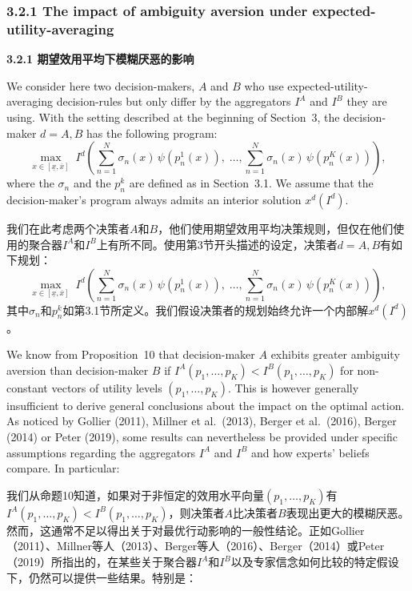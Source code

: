 \documentclass[12pt,a4paper]{article}
\newenvironment{original}
  {\par\noindent\ignorespaces}
  {\par}
\newenvironment{translation}
  {\par\noindent{\color{transblue}\ignorespaces}}
  {\par\medskip}
\begin{document}
\subsubsection{3.2.1 The impact of ambiguity aversion under expected-utility-averaging}
{\color{transblue}\textbf{3.2.1 期望效用平均下模糊厌恶的影响}}

\begin{original}
We consider here two decision-makers, $A$ and $B$ who use expected-utility-averaging decision-rules but only differ by the aggregators $I^{A}$ and $I^{B}$ they are using. With the setting described at the beginning of Section~3, the decision-maker $d = A, B$ has the following program:
\[
\max_{x \in [\underline{x}, \overline{x}]} \; I^{d}\!\left( \sum_{n=1}^{N} \sigma_{n}(x) \, \psi(p^{1}_{n}(x)), \;\dots, \sum_{n=1}^{N} \sigma_{n}(x) \, \psi(p^{K}_{n}(x)) \right), \tag{10}
\]
where the $\sigma_{n}$ and the $p^{k}_{n}$ are defined as in Section~3.1. We assume that the decision-maker's program always admits an interior solution $x^{d}(I^{d})$.
\end{original}

\begin{translation}
我们在此考虑两个决策者$A$和$B$，他们使用期望效用平均决策规则，但仅在他们使用的聚合器$I^{A}$和$I^{B}$上有所不同。使用第3节开头描述的设定，决策者$d = A, B$有如下规划：
\[
\max_{x \in [\underline{x}, \overline{x}]} \; I^{d}\!\left( \sum_{n=1}^{N} \sigma_{n}(x) \, \psi(p^{1}_{n}(x)), \;\dots, \sum_{n=1}^{N} \sigma_{n}(x) \, \psi(p^{K}_{n}(x)) \right), \tag{10}
\]
其中$\sigma_{n}$和$p^{k}_{n}$如第3.1节所定义。我们假设决策者的规划始终允许一个内部解$x^{d}(I^{d})$。
\end{translation}

\begin{original}
We know from Proposition~10 that decision-maker $A$ exhibits greater ambiguity aversion than decision-maker $B$ if $I^{A}(p_{1}, \dots, p_{K}) < I^{B}(p_{1}, \dots, p_{K})$ for non-constant vectors of utility levels $(p_{1}, \dots, p_{K})$. This is however generally insufficient to derive general conclusions about the impact on the optimal action. As noticed by Gollier (2011), Millner et al.\ (2013), Berger et al.\ (2016), Berger (2014) or Peter (2019), some results can nevertheless be provided under specific assumptions regarding the aggregators $I^{A}$ and $I^{B}$ and how experts' beliefs compare. In particular:
\end{original}

\begin{translation}
我们从命题10知道，如果对于非恒定的效用水平向量$(p_{1}, \dots, p_{K})$有$I^{A}(p_{1}, \dots, p_{K}) < I^{B}(p_{1}, \dots, p_{K})$，则决策者$A$比决策者$B$表现出更大的模糊厌恶。然而，这通常不足以得出关于对最优行动影响的一般性结论。正如Gollier（2011）、Millner等人（2013）、Berger等人（2016）、Berger（2014）或Peter（2019）所指出的，在某些关于聚合器$I^{A}$和$I^{B}$以及专家信念如何比较的特定假设下，仍然可以提供一些结果。特别是：
\end{translation}
\end{document}
